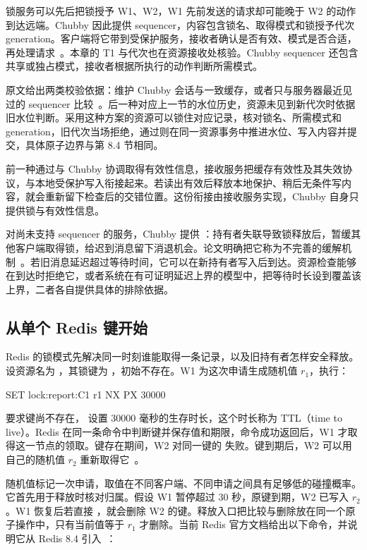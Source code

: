 锁服务可以先后把锁授予 W1、W2，W1 先前发送的请求却可能晚于 W2 的动作到达远端。Chubby 因此提供 sequencer，内容包含锁名、取得模式和锁授予代次 generation。客户端将它带到受保护服务，接收者确认是否有效、模式是否合适，再处理请求~\cite{chubby}。本章的 T1 与代次也在资源接收处核验。Chubby sequencer 还包含共享或独占模式，接收者根据所执行的动作判断所需模式。

原文给出两类校验依据：维护 Chubby 会话与一致缓存，或者只与服务器最近见过的 sequencer 比较~\cite{chubby}。后一种对应上一节的水位历史，资源未见到新代次时依据旧水位判断。采用这种方案的资源可以锁住对应记录，核对锁名、所需模式和 generation，旧代次当场拒绝，通过则在同一资源事务中推进水位、写入内容并提交，具体原子边界与第 8.4 节相同。

前一种通过与 Chubby 协调取得有效性信息，接收服务把缓存有效性及其失效协议，与本地受保护写入衔接起来。若读出有效后释放本地保护、稍后无条件写内容，就会重新留下检查后的交错位置。这份衔接由接收服务实现，Chubby 自身只提供锁与有效性信息。

对尚未支持 sequencer 的服务，Chubby 提供 ：持有者失联导致锁释放后，暂缓其他客户端取得锁，给迟到消息留下消退机会。论文明确把它称为不完善的缓解机制~\cite{chubby}。若旧消息延迟超过等待时间，它可以在新持有者写入后到达。资源检查能够在到达时拒绝它，或者系统在有可证明延迟上界的模型中，把等待时长设到覆盖该上界，二者各自提供具体的排除依据。

\subsection*{从单个 Redis 键开始}

Redis 的锁模式先解决同一时刻谁能取得一条记录，以及旧持有者怎样安全释放。设资源名为 ，其锁键为 ，初始不存在。W1 为这次申请生成随机值 \(r_1\)，执行：

\begin{BookCode}
SET lock:report:C1 r1 NX PX 30000
\end{BookCode}

 要求键尚不存在， 设置 30000 毫秒的生存时长，这个时长称为 TTL（time to live）。Redis 在同一条命令中判断键并保存值和期限，命令成功返回后，W1 才取得这一节点的领取。键存在期间，W2 对同一键的  失败。键到期后，W2 可以用自己的随机值 \(r_2\) 重新取得它~\cite{redis-redlock}。

随机值标记一次申请，取值在不同客户端、不同申请之间具有足够低的碰撞概率。它首先用于释放时核对归属。假设 W1 暂停超过 30 秒，原键到期，W2 已写入 \(r_2\)。W1 恢复后若直接 ，就会删除 W2 的键。释放入口把比较与删除放在同一个原子操作中，只有当前值等于 \(r_1\) 才删除。当前 Redis 官方文档给出以下命令，并说明它从 Redis 8.4 引入~\cite{redis-redlock}：

